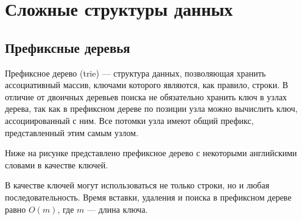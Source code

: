 \chapter{Сложные структуры данных}
\label{ch:advanced-ds}

\section{Префиксные деревья}
\label{sec:trie}
Префиксное дерево (trie) — структура данных, позволяющая хранить ассоциативный массив, ключами которого являются, как правило, строки. В отличие от двоичных деревьев поиска не обязательно хранить ключ в узлах дерева, так как в префиксном дереве по позиции узла можно вычислить ключ, ассоциированный с ним. Все потомки узла имеют общий префикс, представленный этим самым узлом.

Ниже на рисунке представлено префиксное дерево с некоторыми английскими словами в качестве ключей.
\begin{center}
\end{center}

В качестве ключей могут использоваться не только строки, но и любая последовательность. Время вставки, удаления и поиска в префиксном дереве равно $O(m)$, где $m$ — длина ключа.


